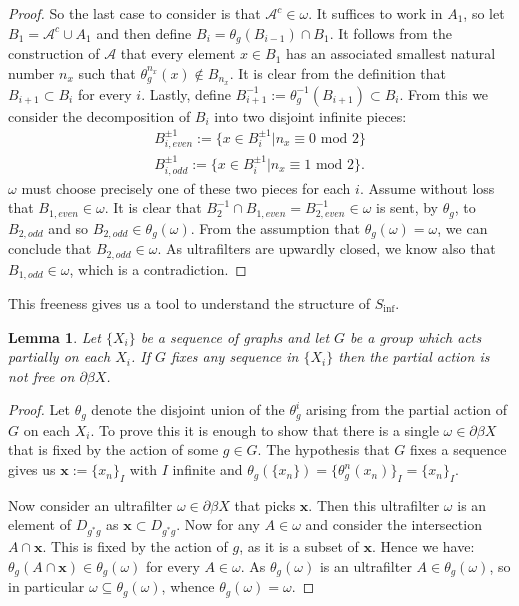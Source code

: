 \documentclass[11pt]{amsart}
\theoremstyle{plain}
\newtheorem{lemma}[theorem]{Lemma}%
\theoremstyle{definition}%
\theoremstyle{remark}%
\begin{document}
\begin{proof}
So the last case to consider is that $\mathcal{A}^{c}\in \omega$. It suffices to work in $A_{1}$, so let $B_{1}=\mathcal{A}^{c}\cup A_{1}$ and then define $B_{i} = \theta_{g}(B_{i-1})\cap B_{1}$. It follows from the construction of $\mathcal{A}$ that every element $x \in B_{1}$ has an associated smallest natural number $n_{x}$ such that $\theta_{g}^{n_{x}}(x) \not \in B_{n_{x}}$. It is clear from the definition that $B_{i+1} \subset B_{i}$ for every $i$. Lastly, define $B^{-1}_{i+1}:=\theta_{g}^{-1}(B_{i+1}) \subset B_{i}$.  From this we consider the decomposition of $B_{i}$ into two disjoint infinite pieces:
\begin{eqnarray*}
B^{\pm 1}_{i,even}:= \lbrace x \in B_{i}^{\pm 1} | n_{x} \equiv 0 \mbox{ mod } 2 \rbrace \\
B^{\pm 1}_{i,odd}:= \lbrace x \in B_{i}^{\pm 1} | n_{x} \equiv 1 \mbox{ mod } 2 \rbrace.
\end{eqnarray*} 
$\omega$ must choose precisely one of these two pieces for each $i$. Assume without loss that $B_{1,even} \in \omega$. It is clear that $B^{-1}_{2} \cap B_{1,even} = B_{2,even}^{-1} \in \omega$ is sent, by $\theta_{g}$, to $B_{2,odd}$ and so $B_{2,odd} \in \theta_{g}(\omega)$. From the assumption that $\theta_{g}(\omega)=\omega$, we can conclude that $B_{2,odd} \in  \omega$. As ultrafilters are upwardly closed, we know also that $B_{1,odd} \in \omega$, which is a contradiction. 
\end{proof}

This freeness gives us a tool to understand the structure of $S_{\inf}$.

\begin{lemma}\label{Lem:CP}
Let $\lbrace X_{i} \rbrace$ be a sequence of graphs and let $G$ be a group which acts partially on each $X_{i}$. If $G$ fixes any sequence in $\lbrace X_{i} \rbrace$ then the partial action is not free on $\partial \beta X$. 
\end{lemma}
\begin{proof}Let $\theta_{g}$ denote the disjoint union of the $\theta_{g}^{i}$ arising from the partial action of $G$ on each $X_{i}$. To prove this it is enough to show that there is a single $\omega \in\partial\beta X$ that is fixed by the action of some $g \in G$. The hypothesis that $G$ fixes a sequence gives us $\textbf{x}:=\lbrace x_{n} \rbrace_{I}$ with $I$ infinite and $\theta_{g}(\lbrace x_{n} \rbrace) = \lbrace\theta_{g}^{n}(x_{n}) \rbrace_{I} =\lbrace x_{n} \rbrace_{I}$.

Now consider an ultrafilter $\omega \in \partial\beta X$ that picks $\textbf{x}$. Then this ultrafilter $\omega$ is an element of $D_{g^{*}g}$ as $\textbf{x} \subset D_{g^{*}g}$.  Now for any $A \in \omega$ and consider the intersection $A \cap \textbf{x}$. This is fixed by the action of $g$, as it is a subset of $\textbf{x}$. Hence we have: $\theta_{g}(A \cap \textbf{x}) \in \theta_{g}(\omega)$ for every $A \in \omega$. As $\theta_{g}(\omega)$ is an ultrafilter $A \in \theta_{g}(\omega)$, so in particular $\omega \subseteq \theta_{g}(\omega)$, whence $\theta_{g}(\omega)=\omega$. 
\end{proof}
\end{document}
